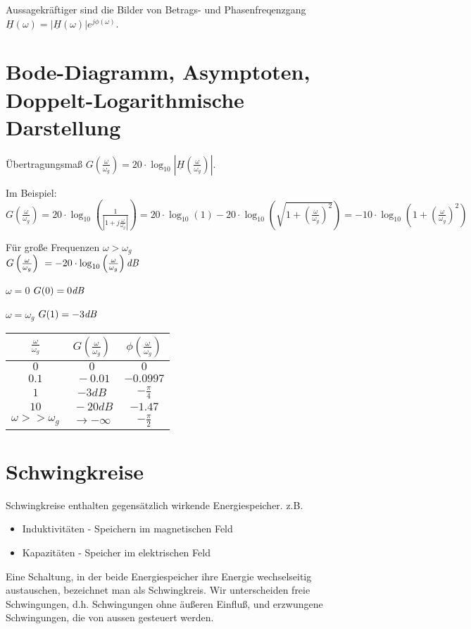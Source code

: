 \documentclass[german]{article}
\begin{document}
Aussagekräftiger sind die Bilder von Betrags- und Phasenfreqenzgang $\underline{H}(\omega) = |\underline{H}(\omega)|e^{j\phi(\omega)}$.

\section{Bode-Diagramm, Asymptoten, Doppelt-Logarithmische Darstellung}
Übertragungsmaß $G\left(\frac{\omega}{\omega_g}\right) = 20 \cdot \log_{10} \left|\underline{H}\left(\frac{\omega}{\omega_g}\right)\right|$.

Im Beispiel: $G\left(\frac{\omega}{\omega_g}\right) = 20 \cdot \log_{10}\left(\frac1{\left|1 + j\frac{\omega}{\omega_g}\right|}\right) = 20 \cdot \log_{10}(1) - 20 \cdot \log_{10}\left(\sqrt{1 + \left(\frac{\omega}{\omega_g}\right)^2}\right) = -10 \cdot \log_{10}\left(1 + \left(\frac{\omega}{\omega_g}\right)^2\right)$

Für große Frequenzen $\omega > \omega_g$ \\
$G\left(\frac{\omega}{\omega_g}\right) ~= -20 \cdot \log_{10}\left(\frac{\omega}{\omega_g}\right) {\it dB}$

$\omega = 0$
$G(0) = 0 {\it dB}$

$\omega = \omega_g$
$G(1) = -3 {\it dB}$

\begin{tabular}{c|c|c}
	$\frac{\omega}{\omega_g}$ & $G\left(\frac{\omega}{\omega_g}\right)$ & $\phi\left(\frac{\omega}{\omega_g}\right)$ \\ \hline
	$0$ & $0$ & $0$ \\
	$0.1$ & $~-0.01$ & $-0.0997$ \\
	$1$ & $-3dB$ & $-\frac{\pi}{4}$ \\
	$10$ & $~-20dB$ & $-1.47$ \\
	$\omega >> \omega_g$ & $\rightarrow -\infty$ & $-\frac{\pi}2$
\end{tabular}

\section{Schwingkreise}
Schwingkreise enthalten gegensätzlich wirkende Energiespeicher.
z.B.
\begin{itemize}
	\item Induktivitäten - Speichern im magnetischen Feld
	\item Kapazitäten - Speicher im elektrischen Feld
\end{itemize}

Eine Schaltung, in der beide Energiespeicher ihre Energie wechselseitig austauschen, bezeichnet man als Schwingkreis. Wir unterscheiden freie Schwingungen, d.h. Schwingungen ohne äußeren Einfluß, und erzwungene Schwingungen, die von aussen gesteuert werden.
\end{document}
